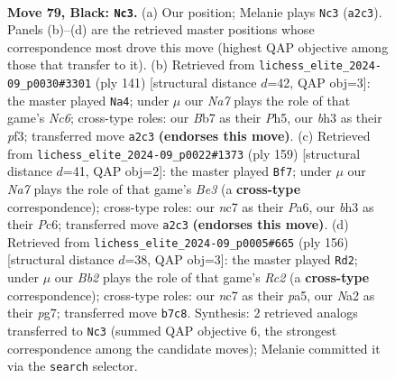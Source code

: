 \documentclass[11pt]{article}
\begin{document}
\clearpage

\begin{figure}[p]\centering
\begin{subfigure}{0.46\textwidth}\centering
\resizebox{\linewidth}{!}{%
\newchessgame
\chessboard[
  setfen={8/PbNR4/6k1/8/1p3P2/6PB/n2K3P/8 b - - 27 79},
  showmover=false,
  pgfstyle=straightmove, color=movearrow, markmove={a2-c3}
]}
\caption{}
\end{subfigure}\hfill
\begin{subfigure}{0.46\textwidth}\centering
\resizebox{\linewidth}{!}{%
\newchessgame
\chessboard[
  setfen={8/5p2/6p1/7p/3k4/2n2P1P/2b3P1/R3K3 b - - 17 71},
  showmover=false,
  pgfstyle=straightmove, color=movearrow, markmove={c3-a4}
]}
\caption{}
\end{subfigure}
\\[4pt]
\begin{subfigure}{0.46\textwidth}\centering
\resizebox{\linewidth}{!}{%
\newchessgame
\chessboard[
  setfen={4k3/6K1/p1p1bP2/2B5/1P6/3P4/2P5/8 b - - 6 80},
  showmover=false,
  pgfstyle=straightmove, color=movearrow, markmove={e6-f7}
]}
\caption{}
\end{subfigure}\hfill
\begin{subfigure}{0.46\textwidth}\centering
\resizebox{\linewidth}{!}{%
\newchessgame
\chessboard[
  setfen={3r3k/3n2p1/7p/pB3P2/4p1PP/8/2R3K1/8 w - - 0 79},
  showmover=false,
  pgfstyle=straightmove, color=movearrow, markmove={c2-d2}
]}
\caption{}
\end{subfigure}
\caption{\textbf{Move 79, Black: \texttt{Nc3}.} (a) Our position; Melanie plays \texttt{Nc3} (\texttt{a2c3}). Panels (b)--(d) are the retrieved master positions whose correspondence most drove this move (highest QAP objective among those that transfer to it). (b) Retrieved from \texttt{lichess\_elite\_2024-09\_p0030\#3301} (ply 141) [structural distance $d$=42, QAP obj=3]: the master played \texttt{Na4}; under $\mu$ our \emph{Na7} plays the role of that game's \emph{Nc6}; cross-type roles: our \emph{B}b7 as their \emph{P}h5, our \emph{b}h3 as their \emph{p}f3; transferred move \texttt{a2c3} \textbf{(endorses this move)}. (c) Retrieved from \texttt{lichess\_elite\_2024-09\_p0022\#1373} (ply 159) [structural distance $d$=41, QAP obj=2]: the master played \texttt{Bf7}; under $\mu$ our \emph{Na7} plays the role of that game's \emph{Be3} (a \textbf{cross-type} correspondence); cross-type roles: our \emph{n}c7 as their \emph{P}a6, our \emph{b}h3 as their \emph{P}c6; transferred move \texttt{a2c3} \textbf{(endorses this move)}. (d) Retrieved from \texttt{lichess\_elite\_2024-09\_p0005\#665} (ply 156) [structural distance $d$=38, QAP obj=3]: the master played \texttt{Rd2}; under $\mu$ our \emph{Bb2} plays the role of that game's \emph{Rc2} (a \textbf{cross-type} correspondence); cross-type roles: our \emph{n}c7 as their \emph{p}a5, our \emph{N}a2 as their \emph{p}g7; transferred move \texttt{b7c8}. Synthesis: 2 retrieved analogs transferred to \texttt{Nc3} (summed QAP objective 6, the strongest correspondence among the candidate moves); Melanie committed it via the \texttt{search} selector.}
\label{fig:thought-m157}
\end{figure}
\end{document}
